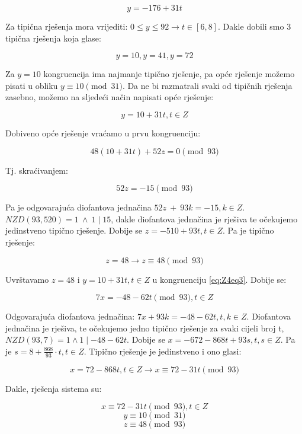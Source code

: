 \documentclass[12pt]{article}
\begin{document}
$$y = -176 + 31t$$\vspace{1mm}

Za tipična rješenja mora vrijediti: $0 \leq y \leq 92 \to t \in [6, 8]$. Dakle dobili smo 3 tipična rješenja koja glase:

$$y = 10, y = 41, y = 72$$\vspace{1mm}

Za $y = 10$ kongruencija ima najmanje tipično rješenje, pa opće rješenje možemo pisati u obliku $y \equiv 10 \pmod{31}$. Da ne bi razmatrali svaki od tipičnih rješenja zasebno, možemo na sljedeći način napisati opće rješenje:

$$y = 10 + 31t, t \in Z$$\vspace{1mm}

Dobiveno opće rješenje vraćamo u prvu kongruenciju:

$$48(10 + 31t) + 52z = 0 \pmod {93}$$\vspace{1mm}

Tj. skraćivanjem:

$$52z = -15 \pmod{93}$$\vspace{1mm}

Pa je odgovarajuća diofantova jednačina $52z\> +\> 93k = -15, k \in Z$. $NZD(93, 520) = 1 \> \land \> 1 \mid 15$, dakle diofantova jednačina je rješiva te očekujemo jedinstveno tipično rješenje. Dobije se $z = -510 + 93t, t \in Z$. Pa je tipično rješenje:

$$z = 48 \to z \equiv 48 \pmod{93}$$\vspace{1mm}

Uvrštavamo $z = 48$ i $y = 10 + 31t, t \in Z$ u kongruenciju \ref{eq:Z4eq3}. Dobije se:

$$7x = -48 - 62t \pmod{93}, t \in Z$$\vspace{1mm}

Odgovarajuća diofantova jednačina: $7x + 93k = -48 - 62t, t, k \in Z$. Diofantova jednačina je rješiva, te očekujemo jedno tipično rješenje za svaki cijeli broj t, $NZD(93, 7) = 1 \land 1 \mid -48 - 62t$.
Dobije se $x = -672 -868t + 93s, t, s \in Z$. Pa je $s = 8 + \frac{868}{93} \cdot t, t \in Z$. Tipično rješenje je jedinstveno i ono glasi:

$$x = 72 - 868t, t \in Z \to x \equiv 72 - 31t \pmod{93}$$\vspace{1mm}

Dakle, rješenja sistema su:

$$x \equiv 72 - 31t \pmod{93}, t \in Z$$
$$y \equiv 10 \pmod{31}$$
$$z \equiv 48 \pmod{93}$$\vspace{1mm}
\end{document}
